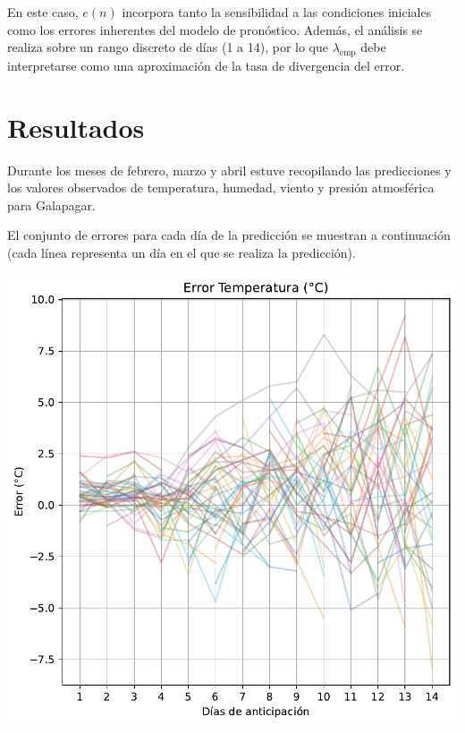 \documentclass[
  10pt,
  a4paper,
  DIV=11,
  numbers=noendperiod,
  open=any]{scrreprt}
\makeatletter
\newcommand*\pandocbounded[1]{%
  \sbox\pandoc@box{#1}%
  \Gscale@div\@tempa{\textheight}{\dimexpr\ht\pandoc@box+\dp\pandoc@box\relax}%
  \Gscale@div\@tempb{\linewidth}{\wd\pandoc@box}%
  \ifdim\@tempb\p@<\@tempa\p@\let\@tempa\@tempb\fi%
  \ifdim\@tempa\p@<\p@\scalebox{\@tempa}{\usebox\pandoc@box}%
  \else\usebox{\pandoc@box}%
  \fi%
}
\numberwithin{equation}{chapter}
\numberwithin{equation}{section}
\renewcommand{\[}{\begin{equation}}
\renewcommand{\]}{\end{equation}}
\providecommand{\pandocbounded}[1]{#1}%
\renewcommand{\pandocbounded}[1]{\begingroup\centering #1\par\endgroup}
\makeatother
\begin{document}
En este caso, \(e(n)\) incorpora tanto la sensibilidad a las condiciones
iniciales como los errores inherentes del modelo de pronóstico. Además,
el análisis se realiza sobre un rango discreto de días (1 a 14), por lo
que \(\lambda_{\text{emp}}\) debe interpretarse como una aproximación de
la tasa de divergencia del error.

\section{Resultados}\label{resultados-2}

Durante los meses de febrero, marzo y abril estuve recopilando las
predicciones y los valores observados de temperatura, humedad, viento y
presión atmosférica para Galapagar.

El conjunto de errores para cada día de la predicción se muestran a
continuación (cada línea representa un día en el que se realiza la
predicción).

\pandocbounded{\includegraphics[keepaspectratio]{03-meteorologia/predicciones_files/figure-pdf/cell-2-output-1.pdf}}
\end{document}

